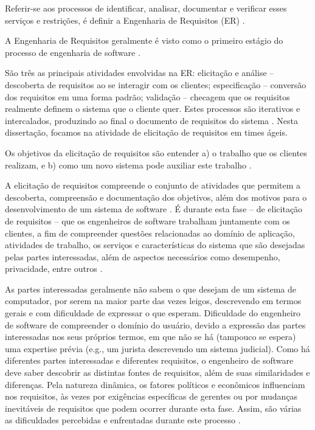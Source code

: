 Referir-se aos processos de identificar, analisar, documentar e verificar esses serviços e restrições, é definir a Engenharia de Requisitos (ER) \cite{sommerville2015software}. 

A Engenharia de Requisitos geralmente é visto como o primeiro estágio do processo de engenharia de software \cite{sommerville2015software}. 

São três as principais atividades envolvidas na ER: elicitação e análise -- descoberta de requisitos ao se interagir com os clientes; especificação -- conversão dos requisitos em uma forma padrão; validação -- checagem que os requisitos realmente definem o sistema que o cliente quer. Estes processos são iterativos e intercalados, produzindo ao final o documento de requisitos do sistema \cite{sommerville2015software}. Nesta dissertação, focamos na atividade de elicitação de requisitos em times ágeis.


Os objetivos da elicitação de requisitos são entender a) o trabalho que os clientes realizam, e b) como um novo sistema pode auxiliar este trabalho \cite{sommerville2015software}. 

A elicitação de requisitos compreende o conjunto de atividades que permitem a descoberta, compreensão e documentação dos objetivos, além dos motivos para o desenvolvimento de um sistema de software \cite{franco2016}. É durante esta fase -- de elicitação de requisitos -- que os engenheiros de software trabalham juntamente com os clientes, a fim de compreender questões relacionadas ao domínio de aplicação, atividades de trabalho, os serviços e características do sistema que são desejadas pelas partes interessadas, além de aspectos necessários como desempenho, privacidade, entre outros \cite{sommerville2015software}.


As partes interessadas geralmente não sabem o que desejam de um sistema de computador, por serem na maior parte das vezes leigos, descrevendo em termos gerais e com dificuldade de expressar o que esperam. Dificuldade do engenheiro de software de compreender o domínio do usuário, devido a expressão das partes interessadas nos seus próprios termos, em que não se há (tampouco se espera) uma expertise prévia (e.g., um jurista descrevendo um sistema judicial). Como há diferentes partes interessadas e diferentes requisitos, o engenheiro de software deve saber descobrir as distintas fontes de requisitos, além de suas similaridades e diferenças. Pela natureza dinâmica, os fatores políticos e econômicos influenciam nos requisitos, às vezes por exigências específicas de gerentes ou por mudanças inevitáveis de requisitos que podem ocorrer durante esta fase. Assim, são várias as dificuldades percebidas e enfrentadas durante este processo \cite{sommerville2015software}.

